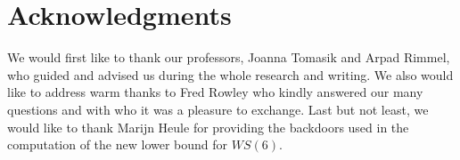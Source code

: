 \documentclass[3p]{elsarticle}
\newtheorem{computational theorem}[definition]{Computational Theorem}
\newcommand{\WS}{\mathit{WS}}
\begin{document}
\section{Acknowledgments}

We would first like to thank our professors, Joanna Tomasik and Arpad Rimmel, who guided and advised
us during the whole research and writing. We also would like to address warm thanks
to Fred Rowley who kindly answered our many questions and with who it was a pleasure to exchange. 
Last but not least, we would like to thank Marijn Heule for providing the backdoors used in the computation of the 
new lower bound for \(\WS(6)\).






\end{document}
